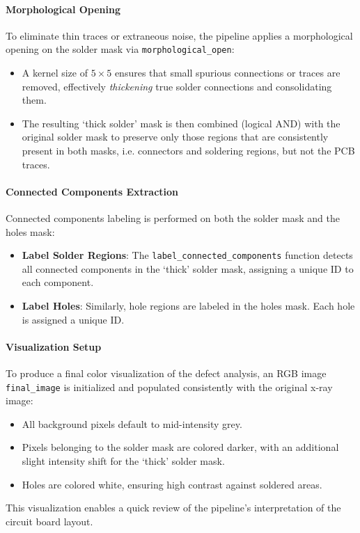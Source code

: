 \documentclass[a4paper,12pt]{article}
\begin{document}
\paragraph{Morphological Opening}

To eliminate thin traces or extraneous noise, the pipeline applies a morphological opening on the solder mask via \texttt{morphological\_open}:
\begin{itemize}
    \item A kernel size of \(5 \times 5\) ensures that small spurious connections or traces are removed, effectively \emph{thickening} true solder connections and consolidating them.
    \item The resulting `thick solder' mask is then combined (logical AND) with the original solder mask to preserve only those regions that are consistently present in both masks, i.e. connectors and soldering regions, but not the PCB traces.
\end{itemize}

\paragraph{Connected Components Extraction}

Connected components labeling is performed on both the solder mask and the holes mask:
\begin{itemize}
    \item \textbf{Label Solder Regions}: The \texttt{label\_connected\_components} function detects all connected components in the `thick' solder mask, assigning a unique ID to each component.
    \item \textbf{Label Holes}: Similarly, hole regions are labeled in the holes mask. Each hole is assigned a unique ID.
\end{itemize}

\paragraph{Visualization Setup}

To produce a final color visualization of the defect analysis, an RGB image \texttt{final\_image} is initialized and populated consistently with the original x-ray image:
\begin{itemize}
    \item All background pixels default to mid-intensity grey.
    \item Pixels belonging to the solder mask are colored darker, with an additional slight intensity shift for the `thick' solder mask.
    \item Holes are colored white, ensuring high contrast against soldered areas.
\end{itemize}
This visualization enables a quick review of the pipeline's interpretation of the circuit board layout.
\end{document}
